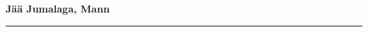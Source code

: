 \documentclass[10pt]{book}
\begin{document}
{
  \samepage
  \raggedbottom
  \raggedright
  \sloppy


  \vspace{0.2in}

  \noindent\begin{minipage}{.1\textwidth}
    \hfill\vspace{0.1in}
  \end{minipage}%
  \noindent\begin{minipage}{.8\textwidth}
    \centering
    \bfseries
    \large J\"a\"a Jumalaga, Mann
  \end{minipage}%
  \noindent\begin{minipage}{.1\textwidth}
      \hfill\vspace{0.1in}
  \end{minipage}

  \nopagebreak[4]
  \vspace{0.1in}
  \nopagebreak[4]
  \hrule height 0.05ex
  \nopagebreak[4]
  \vspace{-0.05in}



  \vspace{0.01in}
  \nopagebreak[4]
  {%
\parindent 0pt
\noindent
\ifx\preLilyPondExample \undefined
\else
  \expandafter\preLilyPondExample
\fi
\def\lilypondbook{}%

\ifx\postLilyPondExample \undefined
\else
  \expandafter\postLilyPondExample
\fi
}

}
\end{document}

